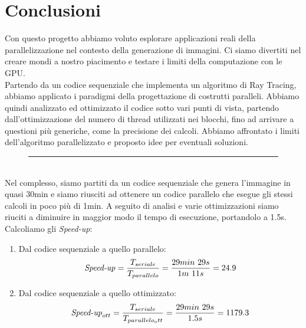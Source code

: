 \documentclass[main.tex]{subfiles}
\begin{document}
\section{Conclusioni}\label{sec:conclusioni}
Con questo progetto abbiamo voluto esplorare applicazioni reali della parallelizzazione nel contesto della generazione di immagini. Ci siamo divertiti nel creare mondi a nostro piacimento e testare i limiti della computazione con le GPU. \\
Partendo da un codice sequenziale che implementa un algoritmo di Ray Tracing, abbiamo applicato i paradigmi della progettazione di costrutti paralleli. Abbiamo quindi analizzato ed ottimizzato il codice sotto vari punti di vista, partendo dall'ottimizzazione del numero di thread utilizzati nei blocchi, fino ad arrivare a questioni più generiche, come la precisione dei calcoli. Abbiamo affrontato i limiti dell'algoritmo parallelizzato e proposto idee per eventuali soluzioni.
\begin{figure}[h]
    \centering
    \captionsetup{aboveskip=0pt}
    \vspace{-14pt}\rule{0.8\linewidth}{0.4pt}
\end{figure}\\
Nel complesso, siamo partiti da un codice sequenziale che genera l'immagine in quasi 30min e siamo riusciti ad ottenere un codice parallelo che esegue gli stessi calcoli in poco più di 1min. A seguito di analisi e varie ottimizzazioni siamo riuciti a diminuire in maggior modo il tempo di esecuzione, portandolo a 1.5s. Calcoliamo gli \textit{Speed-up}:
\begin{enumerate}
    \item  Dal codice sequenziale a quello parallelo:
\[
\text{\textit{Speed-up}} = \frac{T_{seriale}}{T_{parallelo}} = \frac{29min\ 29s}{1m\ 11s} = 24.9
\]
    \item Dal codice sequenziale a quello ottimizzato:
\[
\text{\textit{Speed-up}}_{ott} = \frac{T_{seriale}}{T_{parallelo_ott}} = \frac{29min\ 29s}{1.5s} = 1179.3
\]
\end{enumerate}

\end{document}
